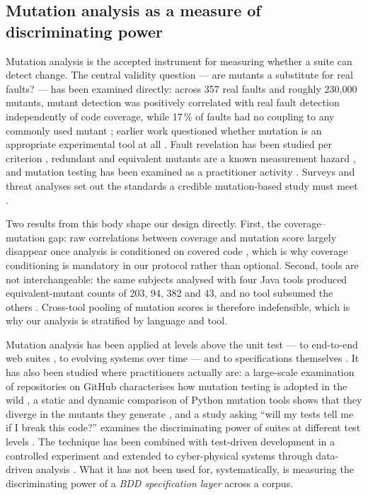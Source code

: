 \subsection{Mutation analysis as a measure of discriminating power}

Mutation analysis is the accepted instrument for measuring whether a suite can detect change. The
central validity question --- are mutants a substitute for real faults? --- has been examined
directly: across 357 real faults and roughly 230{,}000 mutants, mutant detection was positively
correlated with real fault detection independently of code coverage, while 17\,\% of faults had no
coupling to any commonly used mutant \citep{Just2014AreMutants}; earlier work questioned whether
mutation is an appropriate experimental tool at all \citep{Andrews2005IsMutation}. Fault revelation
has been studied per criterion \citep{titcheuchekam2017faultrevelation}, redundant and equivalent
mutants are a known measurement hazard \citep{Just2012RedundantMutants,Yao2014EquivalentStubborn,
Kintis2018DetectingTrivial,Kushigian2024EquivalentWild,Straubinger2024ManualEquivalent}, and mutation
testing has been examined as a practitioner activity \citep{Petrovic2021DoesMutationTesting,
Petrovic2022PracticalMutationTesting}. Surveys and threat analyses set out the standards a credible
mutation-based study must meet \citep{Papadakis2019MutationAdvances,Papadakis2016ThreatsValidity,
jia2011survey}.

Two results from this body shape our design directly. First, the coverage--mutation gap: raw
correlations between coverage and mutation score largely disappear once analysis is conditioned on
covered code \citep{Jain2023MindTheGap}, which is why coverage conditioning is mandatory in our
protocol rather than optional. Second, tools are not interchangeable: the same subjects analysed with
four Java tools produced equivalent-mutant counts of 203, 94, 382 and 43, and no tool subsumed the
others \citep{Kintis2018HowEffectiveTools}. Cross-tool pooling of mutation scores is therefore
indefensible, which is why our analysis is stratified by language and tool.

Mutation analysis has been applied at levels above the unit test --- to end-to-end web suites
\citep{leotta2023mutta}, to evolving systems over time \citep{Ojdanic2023MutationEvolving,
ojdanic2023longstanding,akour2020evolution} --- and to specifications themselves
\citep{black2000specmutation}. It has also been studied where practitioners actually are: a large-scale
examination of repositories on GitHub characterises how mutation testing is adopted in the wild
\citep{Sanchez2022MutationInTheWild}, a static and dynamic comparison of Python mutation tools shows
that they diverge in the mutants they generate \citep{Guerino2024PythonTools}, and a study asking
``will my tests tell me if I break this code?'' examines the discriminating power of suites at
different test levels \citep{niedermayr2016willmytests}. The technique has been combined with
test-driven development in a controlled experiment \citep{roman2020tddm} and extended to
cyber-physical systems through data-driven analysis \citep{vigano2022damat}. What it has not been used
for, systematically, is measuring the discriminating power of a \emph{BDD specification layer} across
a corpus.

